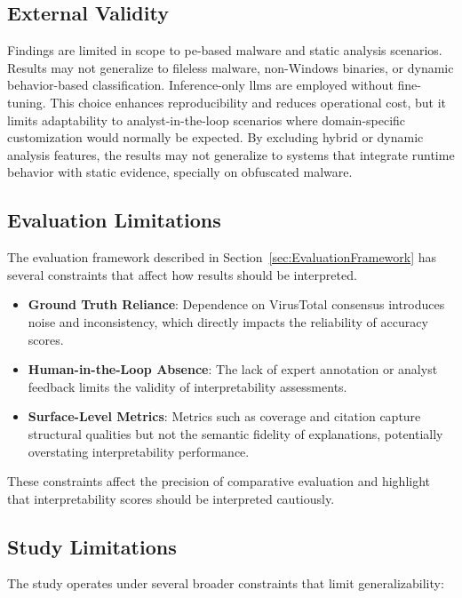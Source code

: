 \subsection{External Validity}\label{subsec:ExternalValidity}
Findings are limited in scope to \gls{pe}-based malware and static analysis scenarios. Results may
not generalize to fileless malware, non-Windows binaries, or dynamic behavior-based classification.
Inference-only \glspl{llm} are employed without fine-tuning. This choice enhances reproducibility
and reduces operational cost, but it limits adaptability to analyst-in-the-loop scenarios where
domain-specific customization would normally be expected. By excluding hybrid or dynamic analysis
features, the results may not generalize to systems that integrate runtime behavior with static
evidence, specially on obfuscated malware.

\subsection{Evaluation Limitations}\label{subsec:EvaluationLimitations}
The evaluation framework described in Section~\ref{sec:EvaluationFramework} has several constraints
that affect how results should be interpreted.

\begin{itemize}
      \item \textbf{Ground Truth Reliance}: Dependence on VirusTotal consensus introduces noise and
            inconsistency, which directly impacts the reliability of accuracy scores.
      \item \textbf{Human-in-the-Loop Absence}: The lack of expert annotation or analyst feedback
            limits the validity of interpretability assessments.
      \item \textbf{Surface-Level Metrics}: Metrics such as coverage and citation capture structural
            qualities but not the semantic fidelity of explanations, potentially overstating
            interpretability performance.
\end{itemize}

These constraints affect the precision of comparative evaluation and highlight that
interpretability scores should be interpreted cautiously.

\subsection{Study Limitations}\label{subsec:StudyLimitations}
The study operates under several broader constraints that limit generalizability:

